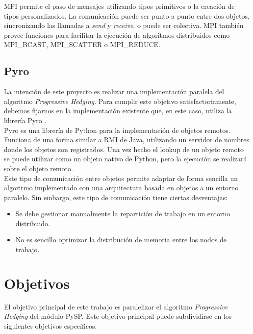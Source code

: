  MPI permite el paso de mensajes utilizando tipos primitivos o la creación de tipos personalizados. La comunicación puede ser punto a punto entre dos objetos, sincronizando las llamadas a \textit{send} y \textit{receive}, o puede ser colectiva. MPI también provee funciones para facilitar la ejecución de algoritmos distribuidos como MPI\_BCAST, MPI\_SCATTER o MPI\_REDUCE.
 
\subsection{Pyro}

La intención de este proyecto es realizar una implementación paralela del algoritmo \textit{Progressive Hedging}. Para cumplir este objetivo satisfactoriamente, debemos fijarnos en la implementación existente que, en este caso, utiliza la librería Pyro \cite{pyro}. \\

Pyro es una librería de Python para la implementación de objetos remotos. Funciona de una forma similar a RMI de Java, utilizando un servidor de nombres donde los objetos son registrados. Una vez hecho el lookup de un objeto remoto se puede utilizar como un objeto nativo de Python, pero la ejecución se realizará sobre el objeto remoto.\\

Este tipo de comunicación entre objetos permite adaptar de forma sencilla un algoritmo implementado con una arquitectura basada en objetos a un entorno paralelo. Sin embargo, este tipo de comunicación tiene ciertas desventajas:

\begin{itemize}
    \item Se debe gestionar manualmente la repartición de trabajo en un entorno distribuido.
    \item No es sencillo optimizar la distribución de memoria entre los nodos de trabajo.
\end{itemize}

\section{Objetivos}


El objetivo principal de este trabajo es paralelizar el algoritmo \textit{Progressive Hedging} del módulo PySP. Este objetivo principal puede subdividirse en los siguientes objetivos específicos:

